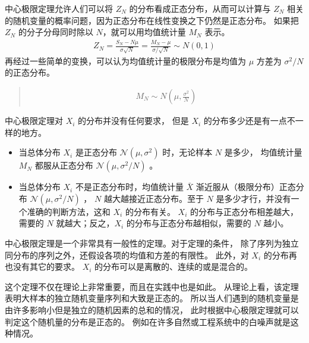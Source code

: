 \documentclass[letterpaper,10pt,english]{sphinxmanual}
\begin{document}
中心极限定理允许人们可以将 \(Z_N\) 的分布看成正态分布，从而可以计算与 \(Z_N\)
相关的随机变量的概率问题，因为正态分布在线性变换之下仍然是正态分布。
如果把 \(Z_N\) 的分子分母同时除以 \(N\)，就可以用均值统计量 \(M_N\) 表示。
\begin{equation}\label{equation:推断与检验/content:推断与检验/content:43}
\begin{split}Z_N  = \frac{S_N - N\mu}{\sigma \sqrt{N}}
=  \frac{M_N - \mu}{\sigma /\sqrt{N}} \sim N(0,1)\end{split}
\end{equation}
再经过一些简单的变换，可以认为均值统计量的极限分布是均值为 \(\mu\) 方差为 \(\sigma^2/N\) 的正态分布。
\begin{quote}
\begin{equation}\label{equation:推断与检验/content:推断与检验/content:44}
\begin{split}M_N \sim N( \mu,\frac{\sigma^2}{N})\end{split}
\end{equation}\end{quote}

中心极限定理对 \(X_i\) 的分布并没有任何要求，
但是 \(X_i\) 的分布多少还是有一点不一样的地方。
\begin{itemize}
\item {} 
当总体分布 \(X_i\) 是正态分布 \(\mathcal{N}(\mu,\sigma^2)\) 时，无论样本 \(N\) 是多少，
均值统计量 \(M_N\) 都服从正态分布 \(\mathcal{N}(\mu,\sigma^2/N)\) 。

\item {} 
当总体分布 \(X_i\) 不是正态分布时，均值统计量 \(\bar{X}\) 渐近服从（极限分布）正态分布 \(\mathcal{N}(\mu,\sigma^2/N)\) ，
\(N\) 越大越接近正态分布。至于 \(N\) 是多少才行，并没有一个准确的判断方法，这和 \(X_i\) 的分布有关。
\(X_i\) 的分布与正态分布相差越大，需要的 \(N\) 就越大；反之，\(X_i\) 的分布与正态分布越相似，需要的 \(N\) 越小。

\end{itemize}

中心极限定理是一个非常具有一般性的定理。对于定理的条件，
除了序列为独立同分布的序列之外，还假设各项的均值和方差的有限性。
此外，对 \(X_i\) 的分布再也没有其它的要求。
\(X_i\) 的分布可以是离散的、连续的或是混合的。

这个定理不仅在理论上非常重要，而且在实践中也是如此。
从理论上看，该定理表明大样本的独立随机变量序列和大致是正态的。
所以当人们遇到的随机变量是由许多影响小但是独立的随机因素的总和的情况，
此时根据中心极限定理就可以判定这个随机量的分布是正态的。
例如在许多自然或工程系统中的白噪声就是这种情况。
\end{document}
